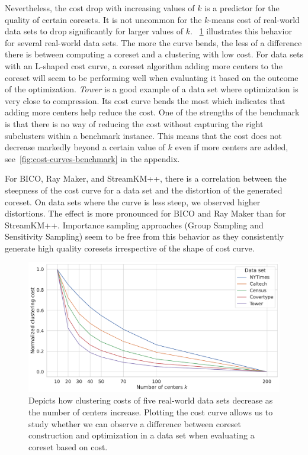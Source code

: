Nevertheless, the cost drop with increasing values of $k$ is a predictor for the quality of certain coresets. It is not uncommon for the $k$-means cost of real-world data sets to drop significantly for larger values of $k$.
~\cref{fig:cost-curves-real-world-datasets} illustrates this behavior for several real-world data sets. The more the curve bends, the less of a difference there is between computing a coreset and a clustering with low cost. For data sets with an L-shaped cost curve, a coreset algorithm adding more centers to the coreset will seem to be performing well when evaluating it based on the outcome of the optimization.
\textit{Tower} is a good example of a data set where optimization is very close to compression. Its cost curve bends the most which indicates that adding more centers help reduce the cost. One of the strengths of the benchmark is that there is no way of reducing the cost without capturing the right subclusters within a benchmark instance. This means that the cost does not decrease markedly beyond a certain value of $k$ even if more centers are added, see~\cref{fig:cost-curves-benchmark} in the appendix. 

For BICO, Ray Maker, and StreamKM++, there is a correlation between the steepness of the cost curve for a data set and the distortion of the generated coreset. 
On data sets where the curve is less steep, we observed higher distortions. The effect is more pronounced for BICO and Ray Maker than for StreamKM++. Importance sampling approaches (Group Sampling and Sensitivity Sampling) seem to be free from this behavior as they consistently generate high quality coresets irrespective of the shape of cost curve.







\begin{figure}
  \centering
  \includegraphics[width=1\linewidth]{figures/cost-curves-real-world-datasets.pdf}
  \caption{Depicts how clustering costs of five real-world data sets decrease as the number of centers increase. 
  Plotting the cost curve allows us to study whether we can observe a difference between coreset construction and optimization in a data set when evaluating a coreset based on cost.
  }
  \label{fig:cost-curves-real-world-datasets}
\end{figure}



